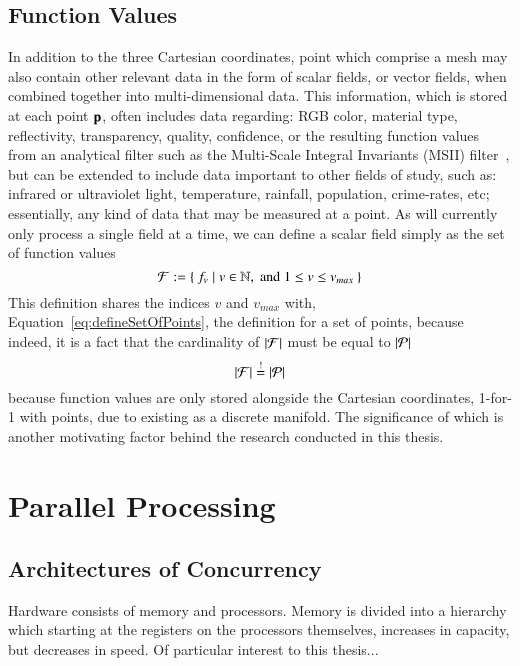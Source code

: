 {{\subsection{Function Values}
\label{ch2s3ssFV}
In addition to the three Cartesian coordinates, point which comprise a mesh may also contain other relevant data in the form of scalar fields, or vector fields, when combined together into multi-dimensional data. This information, which is stored at each point $\mathbf{p}$, often includes data regarding: RGB color, material type, reflectivity, transparency, quality, confidence, or the resulting function values from an analytical filter such as the Multi-Scale Integral Invariants (MSII) filter~\cite[p.~21]{Mara12}, but can be extended to include data important to other fields of study, such as: infrared or ultraviolet light, temperature, rainfall, population, crime-rates, etc; essentially, any kind of data that may be measured at a point. As  will currently only process a single field at a time, we can define a scalar field simply as the set of function values
%
\begin{equation}
	\mathcal{F} := \left \{\: f_v \mid v \in \mathbb{N}, \;\text{and}\; 1\leq v \leq v_{max} \:\right \}
	\label{eq:defineSetOfFunctionValues}
\end{equation}%
%
%
%
This definition shares the indices $v$ and $v_{max}$ with, Equation~\ref{eq:defineSetOfPoints}, the definition for a set of points, because indeed, it is a fact that the cardinality of $|\mathcal{F}|$ must be equal to $|\mathcal{P}|$
%
\begin{equation}
	|\mathcal{F}| \overset{!}{=} |\mathcal{P}|
\end{equation}
%
because function values are only stored alongside the Cartesian coordinates, 1-for-1 with points, due to \tdd{} existing as a discrete manifold. The significance of which is another motivating factor behind the research conducted in this thesis.

%
%
%
%
%
\section{Parallel Processing}
\label{ch2sPP}

%
\subsection{Architectures of Concurrency}
Hardware consists of memory and processors. Memory is divided into a hierarchy which starting at the registers on the processors themselves, increases in capacity, but decreases in speed. Of particular interest to this thesis...

}}
